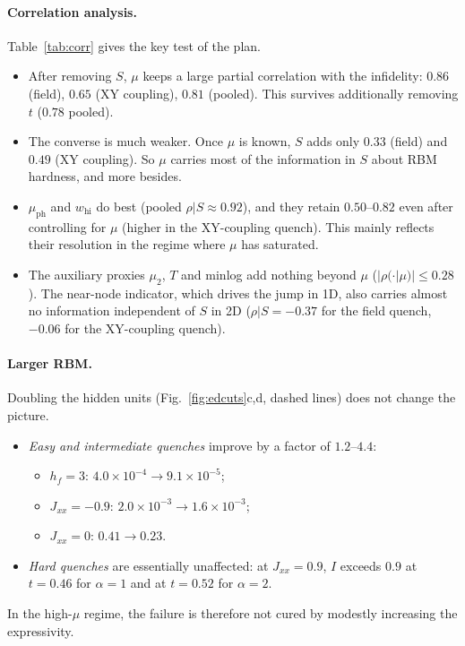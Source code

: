 \documentclass[11pt,a4paper]{article}
\newcommand{\inff}{I}
\begin{document}
\paragraph{Correlation analysis.}
Table~\ref{tab:corr} gives the key test of the plan.
\begin{itemize}
  \item After removing $S$, $\mu$ keeps a large partial correlation with the infidelity:
    $0.86$ (field), $0.65$ (XY coupling), $0.81$ (pooled). This survives additionally removing $t$ ($0.78$
    pooled).
  \item The converse is much weaker. Once $\mu$ is known, $S$ adds only $0.33$ (field) and $0.49$ (XY coupling).
    So $\mu$ carries most of the information in $S$ about RBM hardness, and more besides.
  \item $\mu_{\mathrm{ph}}$ and $w_{\mathrm{hi}}$ do best (pooled $\rho|S\approx0.92$), and they
    retain $0.50$--$0.82$ even after controlling for $\mu$ (higher in the XY-coupling quench). This mainly reflects their resolution in
    the regime where $\mu$ has saturated.
  \item The auxiliary proxies $\mu_2$, $T$ and minlog add nothing beyond $\mu$ ($|\rho(\cdot|\mu)|\le0.28$). The
    near-node indicator, which drives the jump in 1D, also carries almost no information independent of $S$ in 2D
    ($\rho|S=-0.37$ for the field quench, $-0.06$ for the XY-coupling quench).
\end{itemize}

\paragraph{Larger RBM.}
Doubling the hidden units (Fig.~\ref{fig:edcuts}c,d, dashed lines) does not change the picture.
\begin{itemize}
  \item \emph{Easy and intermediate quenches} improve by a factor of $1.2$--$4.4$:
    \begin{itemize}
      \item $h_f=3$: $4.0\times10^{-4}\to9.1\times10^{-5}$;
      \item $J_{xx}=-0.9$: $2.0\times10^{-3}\to1.6\times10^{-3}$;
      \item $J_{xx}=0$: $0.41\to0.23$.
    \end{itemize}
  \item \emph{Hard quenches} are essentially unaffected: at $J_{xx}=0.9$, $\inff$ exceeds $0.9$
    at $t=0.46$ for $\alpha=1$ and at $t=0.52$ for $\alpha=2$.
\end{itemize}
In the high-$\mu$ regime, the failure is therefore not cured by modestly increasing the
expressivity.
\end{document}
